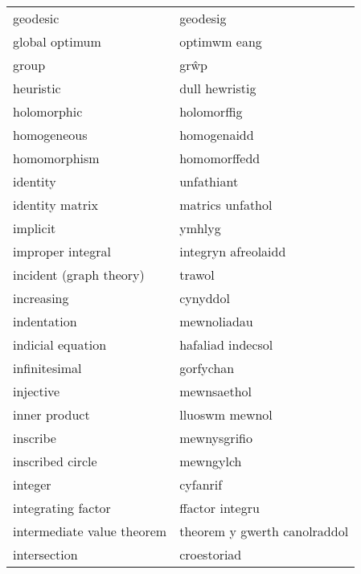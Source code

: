 \begin{supertabular}{p{0.22\textwidth}p{0.22\textwidth}}
                        geodesic &                        geodesig \\
                  global optimum &                    optimwm eang \\
                           group &                            grŵp \\
                       heuristic &                  dull hewristig \\
                     holomorphic &                     holomorffig \\
                     homogeneous &                     homogenaidd \\
                    homomorphism &                    homomorffedd \\
                        identity &                      unfathiant \\
                 identity matrix &                matrics unfathol \\
                        implicit &                          ymhlyg \\
               improper integral &             integryn afreolaidd \\
         incident (graph theory) &                          trawol \\
                      increasing &                        cynyddol \\
                     indentation &                     mewnoliadau \\
               indicial equation &               hafaliad indecsol \\
                   infinitesimal &                       gorfychan \\
                       injective &                     mewnsaethol \\
                   inner product &                  lluoswm mewnol \\
                        inscribe &                    mewnysgrifio \\
                inscribed circle &                       mewngylch \\
                         integer &                        cyfanrif \\
              integrating factor &                 ffactor integru \\
      intermediate value theorem &    theorem y gwerth canolraddol \\
                    intersection &                     croestoriad \\

\end{supertabular}
